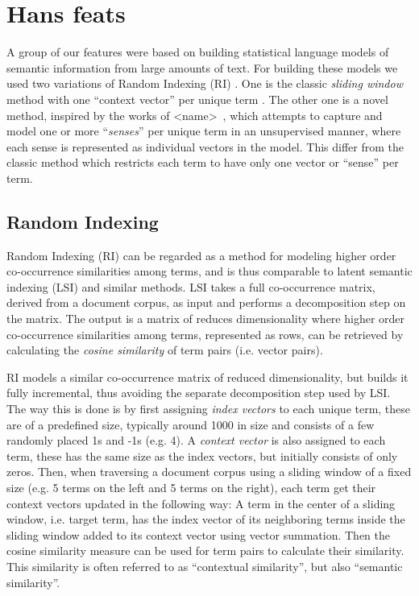 \section{Hans feats}


A group of our features were based on building statistical language models of semantic information from large amounts of text. For building these models we used two variations of Random Indexing (RI) \cite{ first RI }. One is the classic \emph{sliding window} method with one ``context vector'' per unique term \cite{ Sahlgren ... }. The other one is a novel method, inspired by the works of <name>~\cite{ sense clustering paper ...  }, which attempts to capture and model one or more ``\emph{senses}'' per unique term in an unsupervised manner, where each sense is represented as individual vectors in the model. This differ from the classic method which restricts each term to have only one vector or ``sense'' per term.


\subsection{Random Indexing}

Random Indexing (RI) can be regarded as a method for modeling higher order co-occurrence similarities among terms, and is thus comparable to latent semantic indexing (LSI) \cite{ First: Dumais ... } and similar methods. LSI takes a full co-occurrence matrix, derived from a document corpus, as input and performs a decomposition step on the matrix. The output is a matrix of reduces dimensionality where higher order co-occurrence similarities among terms, represented as rows, can be retrieved by calculating the \emph{cosine similarity} of term pairs (i.e. vector pairs). 

RI models a similar co-occurrence matrix of reduced dimensionality, but builds it fully incremental, thus avoiding the separate decomposition step used by LSI. The way this is done is by first assigning \emph{index vectors} to each unique term, these are of a predefined size, typically around 1000 in size and consists of a few randomly placed 1s and -1s (e.g. 4). A \emph{context vector} is also assigned to each term, these has the same size as the index vectors, but initially consists of only zeros. Then, when traversing a document corpus using a sliding window of a fixed size (e.g. 5 terms on the left and 5 terms on the right), each term get their context vectors updated in the following way: A term in the center of a sliding window, i.e. target term, has the index vector of its neighboring terms inside the sliding window added to its context vector using vector summation. Then the cosine similarity measure can be used for term pairs to calculate their similarity. This similarity is often referred to as ``contextual similarity'', but also ``semantic similarity''.


